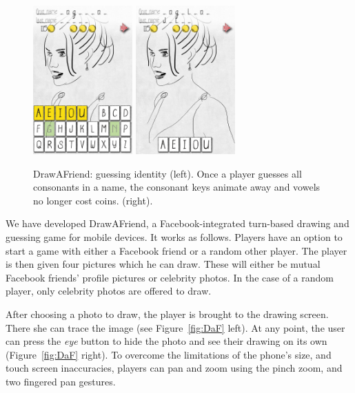 \begin{figure}
  \centering%
\includegraphics[width=1.5in]{DaF/IMG_3032.jpg}
\hspace{0.1in}
\includegraphics[width=1.5in]{DaF/IMG_3033.jpg}
  \caption{DrawAFriend: guessing identity (left). Once a player guesses all consonants in a name, the consonant keys animate away and vowels no longer cost coins. (right).}
  \label{fig:DaF2}
\end{figure}

We have developed DrawAFriend, a Facebook-integrated turn-based drawing and guessing game for mobile devices.  It works as follows. Players have an option to start a game with either a Facebook friend or a random other player.  The player is then given four pictures which he can draw. These will either be mutual Facebook friends' profile pictures or  celebrity photos. In the case of a random player, only celebrity photos are offered to draw.

After choosing a photo to draw, the player is brought to the drawing screen. There she can trace the image (see Figure~\ref{fig:DaF} left). At any point, the user can press the {\em eye} button to hide the photo and see their drawing on its own (Figure~\ref{fig:DaF} right). To overcome the limitations of the phone's size, and touch screen inaccuracies, players can pan and zoom using the pinch zoom, and two fingered pan gestures.

